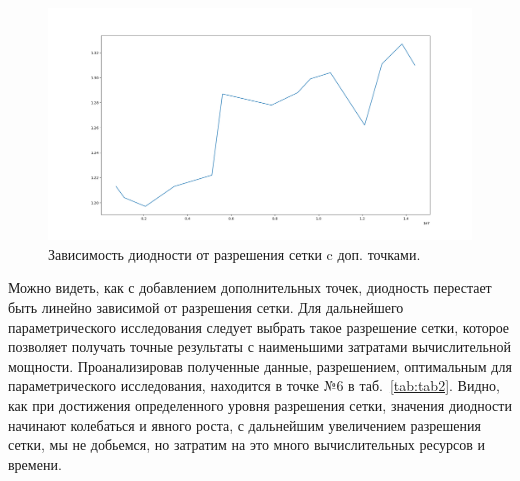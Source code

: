 \documentclass[14pt,a4paper]{article}
\begin{document}
         \begin{figure}[H]
             \centering
             \includegraphics[width = 1\linewidth]{graphDi2}
             \caption{Зависимость диодности от разрешения сетки c доп. точками.}
             \label{fig:graphDi2}
         \end{figure}
           
         Можно видеть, как с добавлением дополнительных точек, диодность перестает быть линейно зависимой от разрешения сетки. Для дальнейшего параметрического исследования следует выбрать такое разрешение сетки, которое позволяет получать точные результаты с наименьшими затратами вычислительной мощности. Проанализировав полученные данные, разрешением, оптимальным для параметрического исследования, находится в точке №6 в таб.~\ref{tab:tab2}. Видно, как при достижения определенного уровня разрешения сетки, значения диодности начинают колебаться и явного роста, с дальнейшим увеличением разрешения сетки, мы не добьемся, но затратим на это много вычислительных ресурсов и времени.  
         
         
                      
            
    
    
\end{document}
